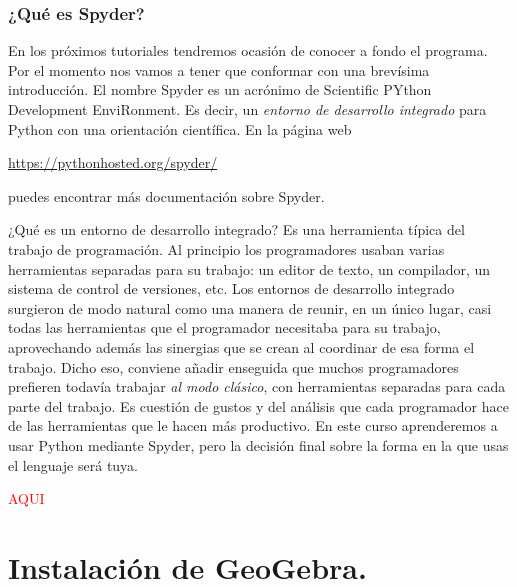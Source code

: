 \documentclass[10pt,a4paper]{article}\usepackage[]{graphicx}\usepackage[]{color}
\newcounter {cont01}
\begin{document}
\subsubsection*{¿Qué es Spyder?}

En los próximos tutoriales tendremos ocasión de conocer a fondo el programa.  Por el momento nos vamos a tener que conformar con una brevísima introducción. El nombre Spyder es un acrónimo de {\sf Scientific PYthon Development EnviRonment.} Es decir, un {\em entorno de desarrollo integrado} para Python con una orientación científica. En la página web 
\begin{center}
\href{https://pythonhosted.org/spyder/}{https://pythonhosted.org/spyder/} 
\end{center}
puedes encontrar más documentación sobre Spyder.

¿Qué es un entorno de desarrollo integrado? Es una herramienta típica del trabajo de programación. Al principio los programadores usaban varias herramientas separadas para su trabajo: un editor de texto, un compilador, un sistema de control de versiones, etc.  Los entornos de desarrollo integrado surgieron de modo natural como una manera de reunir, en un único lugar, casi todas las herramientas que el programador necesitaba para su trabajo, aprovechando además las sinergias que se crean al coordinar de esa forma el trabajo. Dicho eso, conviene añadir enseguida que muchos programadores prefieren todavía trabajar {\em al modo clásico}, con herramientas separadas para cada parte del trabajo. Es cuestión de gustos y del análisis que cada programador hace de las herramientas que le hacen más productivo. En este curso aprenderemos a usar Python mediante Spyder, pero la decisión final sobre la forma en la que usas el lenguaje será tuya.


\textcolor{red}{\Huge AQUI}


\section{Instalación de GeoGebra.}
\label{tut00:sec:InstalacionGeoGebra}
\end{document}
